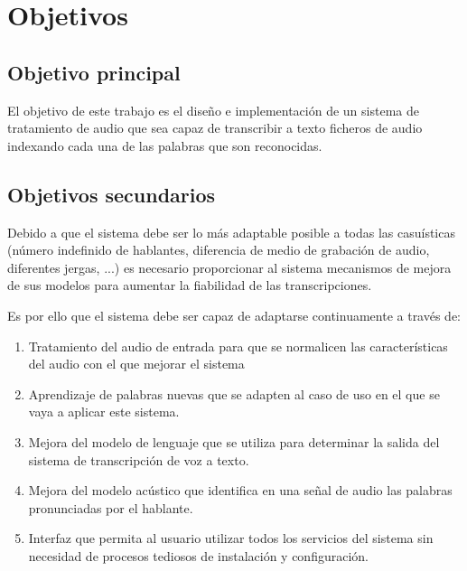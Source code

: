 \documentclass[../main.tex]{subfiles}
\begin{document}
\chapter{Objetivos}\label{ch:objetivos}
\section{Objetivo principal}\label{sec:obj_principal}
El objetivo de este trabajo es el diseño e implementación de un sistema de tratamiento de audio que sea capaz de transcribir a texto ficheros de audio indexando cada una de las palabras que son reconocidas.

\section{Objetivos secundarios}\label{sec:obj_secundarios}
Debido a que el sistema debe ser lo más adaptable posible a todas las casuísticas (número indefinido de hablantes, diferencia de medio de grabación de audio, diferentes jergas, ...) es necesario proporcionar al sistema mecanismos de mejora de sus modelos para aumentar la fiabilidad de las transcripciones.

Es por ello que el sistema debe ser capaz de adaptarse continuamente a través de:
\begin{enumerate}
    \item Tratamiento del audio de entrada para que se normalicen las características del audio con el que mejorar el sistema
    \item Aprendizaje de palabras nuevas que se adapten al caso de uso en el que se vaya a aplicar este sistema.
    \item Mejora del modelo de lenguaje que se utiliza para determinar la salida del sistema de transcripción de voz a texto.
    \item Mejora del modelo acústico que identifica en una señal de audio las palabras pronunciadas por el hablante.
    \item Interfaz que permita al usuario utilizar todos los servicios del sistema sin necesidad de procesos tediosos de instalación y configuración.
\end{enumerate}
\end{document}
